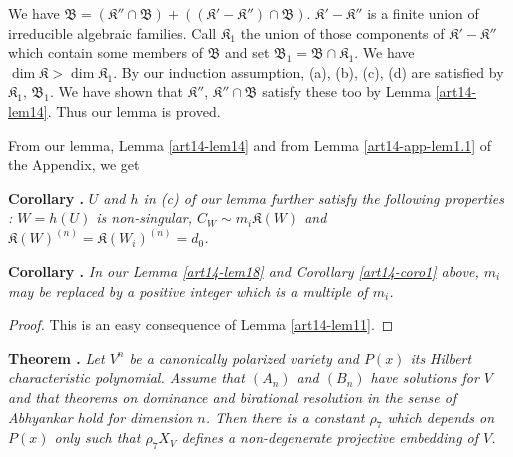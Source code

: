 We have $\mathfrak{B}=(\mathfrak{K}''\cap \mathfrak{B})+((\mathfrak{K}'-\mathfrak{K}'')\cap \mathfrak{B})$. $\mathfrak{K}'-\mathfrak{K}''$ is a finite union of irreducible algebraic families. Call $\mathfrak{K}_{1}$ the union of those components of $\mathfrak{K}'-\mathfrak{K}''$ which contain some members of $\mathfrak{B}$ and set $\mathfrak{B}_{1}=\mathfrak{B}\cap \mathfrak{K}_{1}$. We have $\dim \mathfrak{K}>\dim \mathfrak{K}_{1}$. By our induction assumption, (a), (b), (c), (d) are satisfied by $\mathfrak{K}_{1}$, $\mathfrak{B}_{1}$. We have shown that $\mathfrak{K}''$, $\mathfrak{K}''\cap \mathfrak{B}$ satisfy these too by Lemma \ref{art14-lem14}. Thus our lemma is proved.

From our lemma, Lemma \ref{art14-lem14} and from Lemma \ref{art14-app-lem1.1} of the Appendix, we get

\medskip
\noindent
{\bf Corollary .\label{art14-coro1}}
{\em $U$ and $h$ in {\rm(c)} of our lemma further satisfy the following properties : $W=h(U)$ is non-singular, $C_{W}\sim m_{i}\mathfrak{K}(W)$ and $\mathfrak{K}(W)^{(n)}=\mathfrak{K}(W_{i})^{(n)}=d_{0}$.}

\medskip
\noindent
{\bf Corollary .\label{art14-coro2}}
{\em In our Lemma \ref{art14-lem18} and Corollary \ref{art14-coro1} above, $m_{i}$ may be replaced by a positive integer which is a multiple of $m_{i}$.}

\begin{proof}
This is an easy consequence of Lemma \ref{art14-lem11}.
\end{proof}

\medskip
\noindent
{\bf Theorem .\label{art14-thm2}}
{\em Let $V^{n}$ be a canonically polarized variety and $P(x)$ its Hilbert characteristic polynomial. Assume that $(A_{n})$ and $(B_{n})$ have solutions for $V$ and that theorems on dominance and birational resolution in the sense of Abhyankar hold for dimension $n$. Then there is a constant $\rho_{7}$ which depends on $P(x)$ only such that $\rho_{7}X_{V}$ defines a non-degenerate projective embedding of $V$.}

